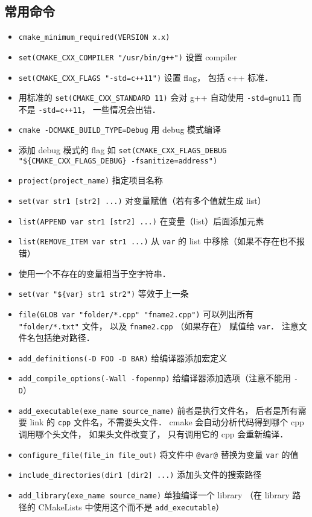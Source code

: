 \subsection{常用命令}
\begin{itemize}
\item \verb`cmake_minimum_required(VERSION x.x)`
\item \verb|set(CMAKE_CXX_COMPILER "/usr/bin/g++")| 设置 compiler
\item \verb|set(CMAKE_CXX_FLAGS "-std=c++11")| 设置 flag， 包括 c++ 标准．
\item 用标准的 \verb|set(CMAKE_CXX_STANDARD 11)| 会对 g++ 自动使用 \verb|-std=gnu11| 而不是 \verb|-std=c++11|， 一些情况会出错．
\item \verb|cmake -DCMAKE_BUILD_TYPE=Debug| 用 debug 模式编译
\item 添加 debug 模式的 flag 如 \verb|set(CMAKE_CXX_FLAGS_DEBUG "${CMAKE_CXX_FLAGS_DEBUG} -fsanitize=address")|
\item \verb`project(project_name)` 指定项目名称
\item \verb`set(var str1 [str2] ...)` 对变量赋值（若有多个值就生成 list）
\item \verb`list(APPEND var str1 [str2] ...)` 在变量（list）后面添加元素
\item \verb|list(REMOVE_ITEM var str1 ...)| 从 \verb|var| 的 list 中移除（如果不存在也不报错）
\item 使用一个不存在的变量相当于空字符串．
\item \verb|set(var "${var} str1 str2")| 等效于上一条
\item \verb`file(GLOB var "folder/*.cpp" "fname2.cpp")` 可以列出所有 \verb|"folder/*.txt"| 文件， 以及 \verb|fname2.cpp| （如果存在） 赋值给 \verb|var|． 注意文件名包括绝对路径．
\item \verb|add_definitions(-D FOO -D BAR)| 给编译器添加宏定义
\item \verb|add_compile_options(-Wall -fopenmp)| 给编译器添加选项（注意不能用 \verb|-D|）
\item \verb`add_executable(exe_name source_name)` 前者是执行文件名， 后者是所有需要 link 的 \verb|cpp| 文件名，不需要头文件． cmake 会自动分析代码得到哪个 cpp 调用哪个头文件， 如果头文件改变了， 只有调用它的 cpp 会重新编译．
\item \verb`configure_file(file_in file_out)` 将文件中 \verb`@var@` 替换为变量 \verb`var` 的值
\item \verb`include_directories(dir1 [dir2] ...)` 添加头文件的搜索路径
\item \verb`add_library(exe_name source_name)` 单独编译一个 library （在 library 路径的 CMakeLists 中使用这个而不是 \verb`add_executable`）

\end{itemize}
